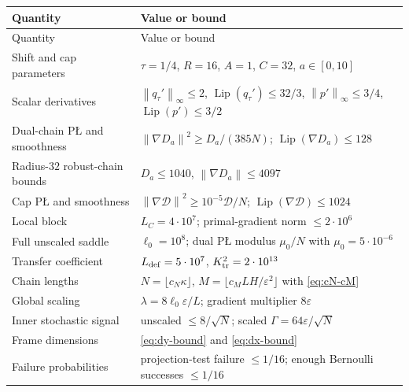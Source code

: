 \documentclass[11pt,a4paper]{article}
\newcommand{\eps}{\varepsilon}
\newcommand{\norm}[1]{\left\lVert #1\right\rVert}
\newcommand{\Lip}{\operatorname{Lip}}
\theoremstyle{definition}
\theoremstyle{remark}
\numberwithin{equation}{section}
\begin{document}
\begin{longtable}{>{\raggedright\arraybackslash}p{}p{}}
\toprule
Quantity & Value or bound \\
\midrule
\endfirsthead
\toprule
Quantity & Value or bound \\
\midrule
\endhead
Shift and cap parameters & $\tau=1/4$, $R=16$, $A=1$, $C=32$, $a\in[0,10]$ \\
Scalar derivatives & $\norm{q_\tau'}_\infty\le2$, $\Lip(q_\tau')\le32/3$, $\norm{p'}_\infty\le3/4$, $\Lip(p')\le3/2$ \\
Dual-chain P\L{} and smoothness & $\norm{\nabla D_a}^2\ge D_a/(385N)$; $\Lip(\nabla D_a)\le128$ \\
Radius-$32$ robust-chain bounds & $D_a\le1040$, $\norm{\nabla D_a}\le4097$ \\
Cap P\L{} and smoothness & $\norm{\nabla\mathscr D}^2\ge10^{-5}\mathscr D/N$; $\Lip(\nabla\mathscr D)\le1024$ \\
Local block & $L_C=4\cdot10^7$; primal-gradient norm $\le2\cdot10^6$ \\
Full unscaled saddle & $\ell_0=10^8$; dual P\L{} modulus $\mu_0/N$ with $\mu_0=5\cdot10^{-6}$ \\
Transfer coefficient & $L_{\rm def}=5\cdot10^7$, $K_{\rm tr}^2=2\cdot10^{13}$ \\
Chain lengths & $N=\lfloor c_N\kappa\rfloor$, $M=\lfloor c_MLH/\eps^2\rfloor$ with \eqref{eq:cN-cM} \\
Global scaling & $\lambda=8\ell_0\eps/L$; gradient multiplier $8\eps$ \\
Inner stochastic signal & unscaled $\le8/\sqrt N$; scaled $\Gamma=64\eps/\sqrt N$ \\
Frame dimensions & \eqref{eq:dy-bound} and \eqref{eq:dx-bound} \\
Failure probabilities & projection-test failure $\le1/16$; enough Bernoulli successes $\le1/16$ \\
\bottomrule
\end{longtable}
\end{document}
